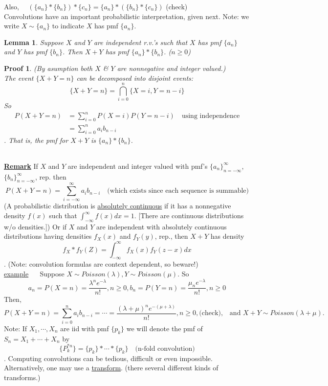 \documentclass[12pt]{article}
\theoremstyle{definition}
\theoremstyle{plain}
\newtheorem{mylemma}{Lemma}[section]
\newtheorem*{myproof}{Proof}
\begin{document}
Also, $\quad (\{a_n\}*\{b_n\})*\{c_n\} = \{a_n\}*(\{b_n\}*\{c_n\})$ (check)
$\mbox{}$ \\
Convolutions have an important probabilistic interpretation, given next. Note: we write $X \sim \{a_n\}$ to indicate $X$ has pmf $\{a_n\}$. 
\begin{mylemma}
Suppose $X$ and $Y$ are independent r.v.'s such that $X$ has pmf $\{a_n\}$ and $Y$ has pmf $\{b_n\}$. Then $X+Y$ has pmf $\{a_n\}*\{b_n\}$. ($n \geq 0$)
\end{mylemma}
\begin{myproof}
(By asumption both $X$ \& $Y$ are nonnegative and integer valued.) \\
The event $\{X+Y=n\}$ can be decomposed into disjoint events: \[\{X+Y=n\}=\bigcap_{i=0}^n\{X=i, Y=n-i\}\] So \begin{displaymath} \begin{aligned}P(X+Y=n) &= \sum_{i=0}^n P(X=i)P(Y=n-i) \quad \mbox{using independence}\\ &= \sum_{i=0}^n a_i b_{n-i} \end{aligned} \end{displaymath}. That is, the pmf for $X+Y$ is $\{a_n\} * \{b_n\}$.
\end{myproof}
$\mbox{}$\\
\underline{\textbf{Remark}} If $X$ and $Y$ are independent and integer valued with pmf's $\{a_n\}_{n=-\infty}^\infty$, $\{b_n\}_{n=-\infty}^\infty$, rep. then \[P(X+Y=n) = \sum_{i=-\infty}^\infty a_i b_{n-i} \quad \mbox{(which exists since each sequence is summable)}\] (A probabilistic distribution is \underline{absolutely continuous} if it has a nonnegative density $f(x)$ such that $\int_{-\infty}^\infty f(x) dx = 1$. [There are continuous distributions w/o densities.]) Or if $X$ and $Y$ are independent with absolutely continuous distributions having densities $f_X(x)$ and $f_Y(y)$, rep., then $X+Y$ has density \[f_X * f_Y(Z) = \int_{-\infty}^\infty f_X(x)f_Y(z-x)dx\]. (Note: convolution formulas are context dependent, so beware!) \\
\underline{example} $\quad$ Suppose $X \sim Poisson(\lambda), Y \sim Poisson(\mu)$. So \[a_n = P(X=n) = \frac{\lambda^n e^{-\lambda}}{n!}, n \geq 0, b_n = P(Y = n) = \frac{\mu_n e^{-\lambda}}{n!}, n \geq 0\] Then, \[P(X+Y=n) = \sum_{i=0}^n a_i b_{n-i} = \cdots = \frac{(\lambda + \mu)^n e^{-(\mu + \lambda)}}{n!}, n \geq 0, \mbox{(check),} \quad \mbox{and $X+Y \sim Poisson(\lambda + \mu).$}\]
Note: If $X_1, \cdots, X_n$ are iid with pmf $\{p_k\}$ we will denote the pmf of $S_n = X_1 + \cdots + X_n$ by \[\{P_k^{*n}\} = \{p_k\}*\cdots * \{p_k\} \quad \mbox{(n-fold convolution)}\]. 
Computing convolutions can be tedious, difficult or even impossible. Alternatively, one may use a \underline{transform}. (there several different kinds of transforms.)
\end{document}
